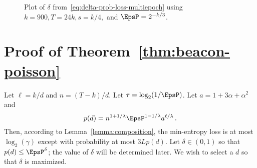 \begin{figure}
  \caption{Plot of $\delta$ from~\eqref{eq:delta-prob-loss-multiepoch} using $k = 900, T = 24k, s = k/4,$ and $\EpsP = 2^{-k/3}$.}
  \label{fig:poisson-beacon}
\end{figure}





\section{Proof of Theorem~\ref{thm:beacon-poisson}}

	Let $\ell = k/d$ and $n = (T - k)/d$. 
	Let $\tau = \log_2(1/\EpsP)$. 
	Let $a = 1 + 3 \alpha + \alpha^2$
	and 
	$$
		p(d) = n^{1+1/\lambda} \EpsP^{1 - 1/\lambda} a^{\ell/\lambda}
		\,.
	$$
	Then, according to Lemma~\ref{lemma:composition}, 
  the min-entropy loss is at most $\log_2(\gamma)$ 
  except with probability at most $3 L p(d)$.	
	Let $\delta \in (0, 1)$ so that $p(d) \leq \EpsP^\delta$; 
	the value of $\delta$ will be determined later. 
	We wish to select a $d$ so that $\delta$ is maximized.


